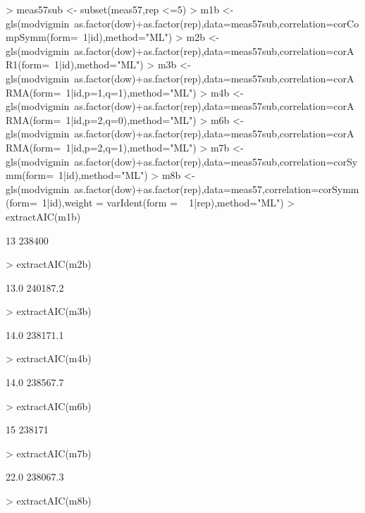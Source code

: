 \documentclass[11pt]{article}
\begin{document}
\begin{Schunk}
\begin{Sinput}
> meas57sub <- subset(meas57,rep <=5)
> m1b <- gls(modvigmin~as.factor(dow)+as.factor(rep),data=meas57sub,correlation=corCompSymm(form=~1|id),method="ML")
> m2b <- gls(modvigmin~as.factor(dow)+as.factor(rep),data=meas57sub,correlation=corAR1(form=~1|id),method="ML")
> m3b <- gls(modvigmin~as.factor(dow)+as.factor(rep),data=meas57sub,correlation=corARMA(form=~1|id,p=1,q=1),method="ML")
> m4b <- gls(modvigmin~as.factor(dow)+as.factor(rep),data=meas57sub,correlation=corARMA(form=~1|id,p=2,q=0),method="ML")
> m6b <- gls(modvigmin~as.factor(dow)+as.factor(rep),data=meas57sub,correlation=corARMA(form=~1|id,p=2,q=1),method="ML")
> m7b <- gls(modvigmin~as.factor(dow)+as.factor(rep),data=meas57sub,correlation=corSymm(form=~1|id),method="ML")
> m8b <- gls(modvigmin~as.factor(dow)+as.factor(rep),data=meas57,correlation=corSymm(form=~1|id),weight = varIdent(form = ~ 1|rep),method="ML")
> extractAIC(m1b)
\end{Sinput}
\begin{Soutput}
[1]     13 238400
\end{Soutput}
\begin{Sinput}
> extractAIC(m2b)
\end{Sinput}
\begin{Soutput}
[1]     13.0 240187.2
\end{Soutput}
\begin{Sinput}
> extractAIC(m3b)
\end{Sinput}
\begin{Soutput}
[1]     14.0 238171.1
\end{Soutput}
\begin{Sinput}
> extractAIC(m4b)
\end{Sinput}
\begin{Soutput}
[1]     14.0 238567.7
\end{Soutput}
\begin{Sinput}
> extractAIC(m6b)
\end{Sinput}
\begin{Soutput}
[1]     15 238171
\end{Soutput}
\begin{Sinput}
> extractAIC(m7b)
\end{Sinput}
\begin{Soutput}
[1]     22.0 238067.3
\end{Soutput}
\begin{Sinput}
> extractAIC(m8b)
\end{Sinput}

\end{Schunk}
\end{document}
